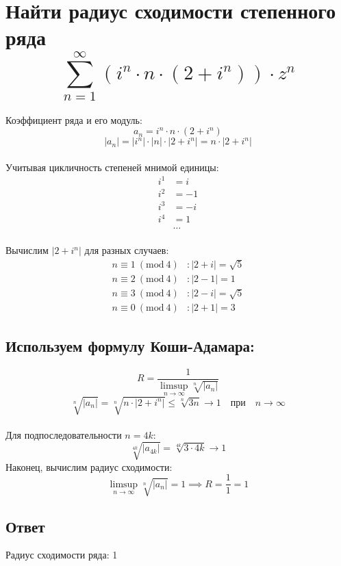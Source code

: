 \documentclass[12pt]{article}
\begin{document}
\section{Найти радиус сходимости степенного ряда $$\sum_{n=1}^{\infty} (i^n \cdot n \cdot (2 + i^n)) \cdot z^n$$}
Коэффициент ряда и его модуль:
$$a_n = i^n \cdot n \cdot (2 + i^n)$$
$$|a_n| = |i^n| \cdot |n| \cdot |2 + i^n| = n \cdot |2 + i^n|$$
\\
Учитывая цикличность степеней мнимой единицы:
\begin{align*}
i^1 &= i \\
i^2 &= -1 \\
i^3 &= -i \\
i^4 &= 1 \\
&\dots
\end{align*}
\\
Вычислим $|2 + i^n|$ для разных случаев:
\begin{align*}
n \equiv 1 \ (\mathrm{mod}\ 4) &: |2 + i| = \sqrt{5} \\
n \equiv 2 \ (\mathrm{mod}\ 4) &: |2 - 1| = 1 \\
n \equiv 3 \ (\mathrm{mod}\ 4) &: |2 - i| = \sqrt{5} \\
n \equiv 0 \ (\mathrm{mod}\ 4) &: |2 + 1| = 3
\end{align*}
\subsection*{Используем формулу Коши-Адамара:}
$$R = \frac{1}{\limsup_{n\to\infty} \sqrt[n]{|a_n|}}$$
$$\sqrt[n]{|a_n|} = \sqrt[n]{n \cdot |2 + i^n|} \leq \sqrt[n]{3n} \to 1 \quad \text{при} \quad n\to\infty$$
\\
Для подпоследовательности $n=4k$:
$$\sqrt[4k]{|a_{4k}|} = \sqrt[4k]{3 \cdot 4k} \to 1$$
Наконец, вычислим радиус сходимости:
$$\limsup_{n\to\infty} \sqrt[n]{|a_n|} = 1 \implies R = \frac{1}{1} = 1$$
\subsection*{Ответ}
Радиус сходимости ряда: 1
\end{document}
